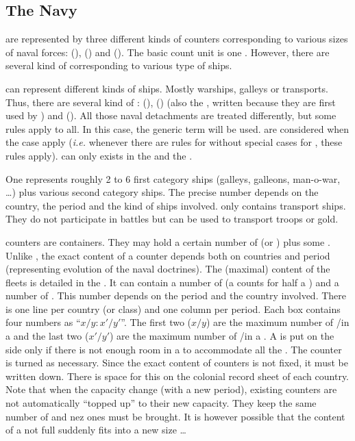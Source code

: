 \subsection{The Navy}

 are represented by three different kinds of counters
corresponding to various sizes of naval forces:  (\FLEET),
 (\ND) and 
(\NDE).
\bparag The basic count unit is one \ND. However, there are several kind of
\ND corresponding to various type of ships.

 \ND can represent different kinds of
ships. Mostly warships, galleys or transports.
\bparag Thus, there are several kind of \ND: 
(\NWD),  (\NGD) (also the ,
written \VGD because they are first used by \VEN) and  (\NTD).
\bparag All those naval detachments are treated differently, but some rules
apply to all. In this case, the generic term \ND will be used.
\bparag \VGD are considered \NGD when the case apply (\emph{i.e.} whenever
there are rules for \NGD without special cases for \VGD, these rules apply).
\bparag \NGD can only exists in the \regionMediterrannee and the
\regionBaltique.

\aparag[Detachments.] One \ND represents roughly 2 to 6 first category ships
(galleys, galleons, man-o-war, \ldots) plus various second category ships. The
precise number depends on the country, the period and the kind of ships
involved.
\bparag \NTD only contains transport ships. They do not participate in battles
but can be used to transport troops or gold.

\aparag[Fleets.] \FLEET counters are containers. They may hold a certain
number of \NWD (or \NGD) plus some \NTD.
\bparag Unlike \ARMY, the exact content of a \FLEET counter depends both on
countries and period (representing evolution of the naval doctrines).
\bparag The (maximal) content of the fleets is detailed in the
. It can contain a number of \NWD (a
\NGD counts for half a \NWD) and a number of \NTD. This number depends on the
period and the country involved.
\bparag There is one line per country (or class) and one column per
period. Each box contains four numbers as ``$x/y:x'/y'$''. The first two
($x/y$) are the maximum number of \NWD/\NTD in a \FLEET\facemoins and the last
two ($x'/y'$) are the maximum number of \NWD/\NTD in a \FLEET\faceplus.
\bparag A \FLEET is put on the side \Faceplus only if there is not enough room
in a \FLEET\facemoins to accommodate all the \ND. The counter is turned as
necessary.
\bparag Since the exact content of \FLEET counters is not fixed, it must be
written down. There is space for this on the colonial record sheet of each
country.
\bparag Note that when the capacity change (with a new period), existing
\FLEET counters are not automatically ``topped up'' to their new
capacity. They keep the same number of \ND and nez ones must be brought. It is
however possible that the content of a not full \FLEET\Faceplus suddenly fits
into a new size \FLEET\Facemoins\ldots

